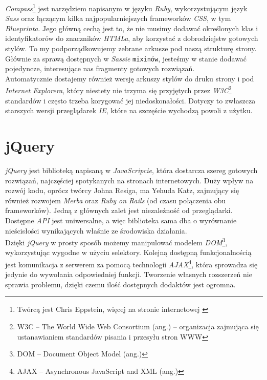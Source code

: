\documentclass[12pt,twoside]{report}
\begin{document}
\emph{Compass}\footnote{Twórcą jest Chris Eppstein, więcej na stronie internetowej
\cite{compass}} jest narzędziem napisanym w języku \emph{Ruby}, wykorzystującym język
\emph{Sass} oraz łączącym kilka najpopularniejszych frameworków \emph{CSS}, w tym
\emph{Blueprinta}. Jego główną cechą jest to, że nie musimy dodawać określonych klas i
identyfikatorów do znaczników \emph{HTMLa}, aby korzystać z dobrodziejstw gotowych stylów.
To my podporządkowujemy zebrane arkusze pod naszą strukturę strony. Głównie za sprawą
dostępnych w \emph{Sassie} \texttt{mixinów}, jesteśmy w stanie dodawać pojedyncze,
interesujące nas fragmenty gotowych rozwiązań.\\
Automatycznie dostajemy również wersję arkuszy stylów do druku strony i pod \emph{Internet
Explorera}, który niestety nie trzyma się przyjętych przez \emph{W3C}\footnote{W3C -- The
World Wide Web Consortium (ang.) -- organizacja zajmująca się ustanawianiem standardów pisania i
przesyłu stron WWW} standardów i często trzeba korygować jej niedoskonałości. Dotyczy to
zwłaszcza starszych wersji przeglądarek \emph{IE}, które na szczęście wychodzą powoli z
użytku.


\section{jQuery}
\emph{jQuery} jest biblioteką napisaną w \emph{JavaScripcie}, która dostarcza szereg
gotowych rozwiązań, najczęściej spotykanych na stronach internetowych. Duży wpływ na
rozwój kodu, oprócz twórcy Johna Resiga, ma Yehuda Katz, zajmujący się również rozwojem
\emph{Merba} oraz \emph{Ruby on Rails} (od czasu połączenia obu frameworków).
Jedną z głównych zalet jest niezależność od przeglądarki. Dostępne \emph{API} jest
uniwersalne, a więc biblioteka sama dba o wyrównanie nieścisłości wynikających właśnie ze
środowiska działania.\\
Dzięki \emph{jQuery} w prosty sposób możemy manipulować modelem \emph{DOM}\footnote{DOM --
Document Object Model (ang.)}, wykorzystując wygodne w użyciu selektory. Kolejną dostępną
funkcjonalnością jest komunikacja z serwerem za pomocą technologii
\emph{AJAX}\footnote{AJAX -- Asynchronous JavaScript and XML (ang.)}, która sprowadza się
jedynie do wywołania odpowiedniej funkcji. Tworzenie własnych rozszerzeń nie sprawia
problemu, dzięki czemu ilość dostępnych dodaktów jest ogromna.
\end{document}
